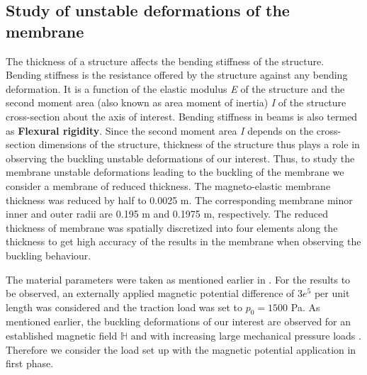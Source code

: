 \documentclass[11pt,a4paper,final]{article}
\begin{document}
\subsection{Study of unstable deformations of the membrane}

The thickness of a structure affects the bending stiffness of the structure. Bending stiffness is the resistance offered by the structure against any bending deformation. It is a function of the elastic modulus \textit{E} of the structure and the second moment area (also known as area moment of inertia) \textit{I} of the structure cross-section about the axis of interest. Bending stiffness in beams is also termed as \textbf{Flexural rigidity}. Since the second moment area \textit{I} depends on the cross-section dimensions of the structure, thickness of the structure thus plays a role in observing the buckling unstable deformations of our interest. Thus, to study the membrane unstable deformations leading to the buckling of the membrane we consider a membrane of reduced thickness. The magneto-elastic membrane thickness was reduced by half to 0.0025 m. The corresponding membrane minor inner and outer radii are 0.195 m and 0.1975 m, respectively. The reduced thickness of membrane was spatially discretized into four elements along the thickness to get high accuracy of the results in the membrane when observing the buckling behaviour.  \par 

The material parameters were taken as mentioned earlier in . For the results to be observed, an externally applied magnetic potential difference of $3e^5$ per unit length was considered and the traction load was set to $p_0 = 1500$ Pa. As mentioned earlier, the buckling deformations of our interest are observed for an established magnetic field $\mathbb{H}$ and with increasing large mechanical pressure loads \cite{Reddy2017,Reddy2018}. Therefore we consider the load set up with the magnetic potential application in first phase. \par 
\end{document}
